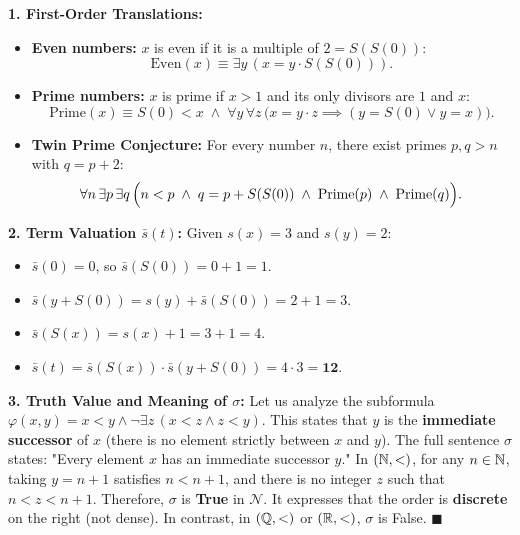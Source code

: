 \begin{solution}
\textbf{1. First-Order Translations:}
\begin{itemize}[leftmargin=1.4em,itemsep=2pt]
  \item \textbf{Even numbers:} $x$ is even if it is a multiple of $2 = S(S(0))$:
  \[
  \mathrm{Even}(x) \equiv \exists y\, (x = y \cdot S(S(0))).
  \]
  \item \textbf{Prime numbers:} $x$ is prime if $x > 1$ and its only divisors are $1$ and $x$:
  \[
  \mathrm{Prime}(x) \equiv S(0) < x \;\land\; \forall y\, \forall z\, \bigl(x = y \cdot z \implies (y = S(0) \lor y = x)\bigr).
  \]
  \item \textbf{Twin Prime Conjecture:} For every number $n$, there exist primes $p, q > n$ with $q = p + 2$:
  \[
  \forall n\, \exists p\, \exists q\, \Bigl(n < p \;\land\; q = p + S(S(0)) \;\land\; \mathrm{Prime}(p) \;\land\; \mathrm{Prime}(q)\Bigr).
  \]
\end{itemize}

\textbf{2. Term Valuation $\bar{s}(t)$:}
Given $s(x) = 3$ and $s(y) = 2$:
\begin{itemize}[leftmargin=1.4em,itemsep=2pt]
  \item $\bar{s}(0) = 0$, so $\bar{s}(S(0)) = 0 + 1 = 1$.
  \item $\bar{s}(y + S(0)) = s(y) + \bar{s}(S(0)) = 2 + 1 = 3$.
  \item $\bar{s}(S(x)) = s(x) + 1 = 3 + 1 = 4$.
  \item $\bar{s}(t) = \bar{s}(S(x)) \cdot \bar{s}(y + S(0)) = 4 \cdot 3 = \mathbf{12}$.
\end{itemize}

\textbf{3. Truth Value and Meaning of $\sigma$:}
Let us analyze the subformula $\varphi(x, y) = x < y \land \neg \exists z\, (x < z \land z < y)$.
This states that $y$ is the \textbf{immediate successor} of $x$ (there is no element strictly between $x$ and $y$).
The full sentence $\sigma$ states: "Every element $x$ has an immediate successor $y$."
In $(\mathbb{N}, <)$, for any $n \in \mathbb{N}$, taking $y = n + 1$ satisfies $n < n + 1$, and there is no integer $z$ such that $n < z < n + 1$.
Therefore, $\sigma$ is \textbf{True} in $\mathcal{N}$.
It expresses that the order is \textbf{discrete} on the right (not dense). In contrast, in $(\mathbb{Q}, <)$ or $(\mathbb{R}, <)$, $\sigma$ is False. \hfill $\blacksquare$
\end{solution}

